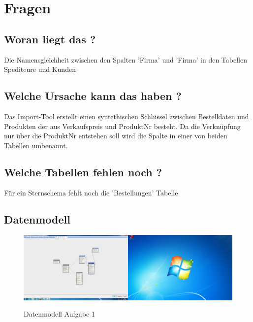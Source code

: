 \documentclass[10pt]{scrartcl}
\author{André Harms, Oliver Steenbuck}
\title{\titletext}
\date{19.11.2012}
\begin{document}
\maketitle

\setcounter{tocdepth}{3}
\tableofcontents

\section{Fragen}
\subsection{Woran liegt das ?}
Die Namensgleichheit zwischen den Spalten 'Firma' und 'Firma' in den Tabellen Spediteure und Kunden

\subsection{Welche Ursache kann das haben ?}
Das Import-Tool erstellt einen syntethischen Schlüssel zwischen Bestelldaten und Produkten der aus Verkaufspreis und ProduktNr besteht. Da die Verknüpfung nur über die ProduktNr entstehen soll wird die Spalte in einer von beiden Tabellen umbenannt.

\subsection{Welche Tabellen fehlen noch ?}
Für ein Sternschema fehlt noch die 'Bestellungen' Tabelle


\subsection{Datenmodell}
\begin{figure}[H]
\begin{turn}{0}	
	\label{pic:datenmodell}
	\includegraphics[scale=0.6]{datenmodell1.png}
	\caption{Datenmodell Aufgabe 1} 
\end{turn}
\end{figure}
\end{document}

